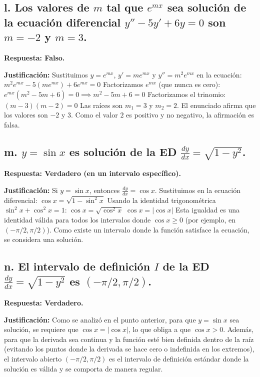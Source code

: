 \documentclass[a4paper]{article}
\begin{document}
\subsection*{l. Los valores de $m$ tal que $e^{mx}$ sea solución de la ecuación diferencial $y'' - 5y' + 6y = 0$ son $m = -2$ y $m = 3$.}

\textbf{Respuesta: Falso.}

\textbf{Justificación:}
Sustituimos $y = e^{mx}$, $y' = me^{mx}$ y $y'' = m^2e^{mx}$ en la ecuación:
$m^2e^{mx} - 5(me^{mx}) + 6e^{mx} = 0$
Factorizamos $e^{mx}$ (que nunca es cero):
$e^{mx}(m^2 - 5m + 6) = 0 \implies m^2 - 5m + 6 = 0$
Factorizamos el trinomio:
$(m - 3)(m - 2) = 0$
Las raíces son $m_1 = 3$ y $m_2 = 2$.
El enunciado afirma que los valores son $-2$ y $3$. Como el valor $2$ es positivo y no negativo, la afirmación es falsa.

\subsection*{m. $y = \sin x$ es solución de la ED $\frac{dy}{dx} = \sqrt{1 - y^2}$.}

\textbf{Respuesta: Verdadero (en un intervalo específico).}

\textbf{Justificación:}
Si $y = \sin x$, entonces $\frac{dy}{dx} = \cos x$.
Sustituimos en la ecuación diferencial:
$\cos x = \sqrt{1 - \sin^2 x}$
Usando la identidad trigonométrica $\sin^2 x + \cos^2 x = 1$:
$\cos x = \sqrt{\cos^2 x}$
$\cos x = |\cos x|$
Esta igualdad es una identidad válida para todos los intervalos donde $\cos x \geq 0$ (por ejemplo, en $(-\pi/2, \pi/2)$). Como existe un intervalo donde la función satisface la ecuación, se considera una solución.

\subsection*{n. El intervalo de definición $I$ de la ED $\frac{dy}{dx} = \sqrt{1 - y^2}$ es $(-\pi/2, \pi/2)$.}

\textbf{Respuesta: Verdadero.}

\textbf{Justificación:}
Como se analizó en el punto anterior, para que $y = \sin x$ sea solución, se requiere que $\cos x = |\cos x|$, lo que obliga a que $\cos x > 0$. Además, para que la derivada sea continua y la función esté bien definida dentro de la raíz (evitando los puntos donde la derivada se hace cero o indefinida en los extremos), el intervalo abierto $(-\pi/2, \pi/2)$ es el intervalo de definición estándar donde la solución es válida y se comporta de manera regular.
\end{document}
